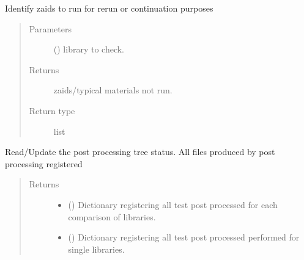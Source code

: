 \documentclass[letterpaper,10pt,english]{sphinxmanual}
\begin{document}
\begin{fulllineitems}
\begin{fulllineitems}
\label{\detokenize{api/initobjects:status.Status.get_unfinished_zaids}}
\sphinxAtStartPar
Identify zaids to run for rerun or continuation purposes
\begin{quote}\begin{description}
\item[{Parameters}] \leavevmode
\sphinxAtStartPar
{} () \textendash{} library to check.

\item[{Returns}] \leavevmode
\sphinxAtStartPar
{} \textendash{} zaids/typical materials not run.

\item[{Return type}] \leavevmode
\sphinxAtStartPar
list

\end{description}\end{quote}

\end{fulllineitems}


\begin{fulllineitems}
\label{\detokenize{api/initobjects:status.Status.update_pp_status}}
\sphinxAtStartPar
Read/Update the post processing tree status. All files produced by
post processing registered
\begin{quote}\begin{description}
\item[{Returns}] \leavevmode
\sphinxAtStartPar
\begin{itemize}
\item {} 
\sphinxAtStartPar
{} () \textendash{} Dictionary registering all test post processed for each
comparison of libraries.

\item {} 
\sphinxAtStartPar
{} () \textendash{} Dictionary registering all test post processed performed for
single libraries.

\end{itemize}



\end{description}
\end{quote}
\end{fulllineitems}
\end{fulllineitems}
\end{document}
